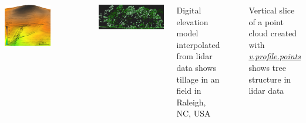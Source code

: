 \documentclass[25pt, margin=0mm, innermargin=25mm, blockverticalspace=25mm, colspace=25mm, subcolspace=8mm]{tikzposter}
\newcommand{\gamodule}[1]{\href{http://grass.osgeo.org/grass74/manuals/addons/#1.html}{\emph{#1}}}
\begin{document}
\begin{columns}
{%

\centering
\begin{minipage}{0.48\linewidth}
\centering
\includegraphics[width=0.7\textwidth]{elevation_lidar}
\end{minipage}
~
\begin{minipage}{0.48\linewidth}
\centering
\includegraphics[width=\textwidth]{lidar_profile}
\end{minipage}

\bigskip

\begin{minipage}{0.48\linewidth}
\centering
Digital elevation model interpolated from lidar data shows tillage in an field in Raleigh, NC, USA
\end{minipage}
~
\begin{minipage}{0.48\linewidth}
\centering
Vertical slice of a point cloud created with \gamodule{v.profile.points} shows tree structure in lidar data
\end{minipage}

}



\end{columns}
\end{document}
